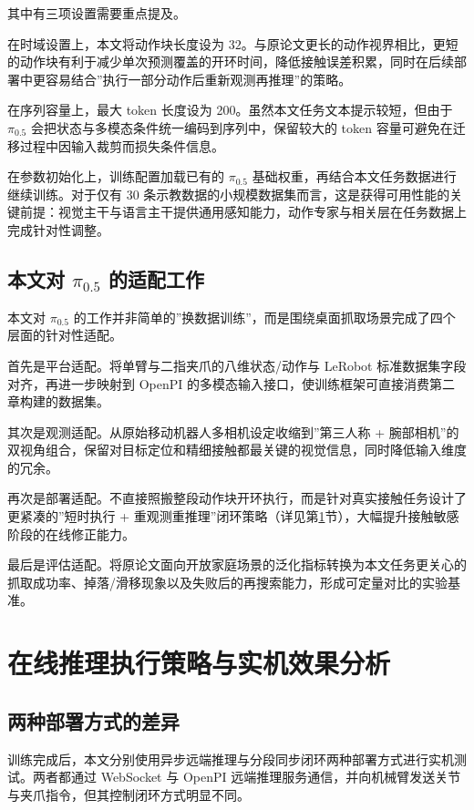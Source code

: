其中有三项设置需要重点提及。

在时域设置上，本文将动作块长度设为 $32$。与原论文更长的动作视界相比，更短的动作块有利于减少单次预测覆盖的开环时间，降低接触误差积累，同时在后续部署中更容易结合”执行一部分动作后重新观测再推理”的策略。

在序列容量上，最大 token 长度设为 200。虽然本文任务文本提示较短，但由于 $\pi_{0.5}$ 会把状态与多模态条件统一编码到序列中，保留较大的 token 容量可避免在迁移过程中因输入裁剪而损失条件信息。

在参数初始化上，训练配置加载已有的 $\pi_{0.5}$ 基础权重，再结合本文任务数据进行继续训练。对于仅有 30 条示教数据的小规模数据集而言，这是获得可用性能的关键前提：视觉主干与语言主干提供通用感知能力，动作专家与相关层在任务数据上完成针对性调整。

\subsection{本文对 $\pi_{0.5}$ 的适配工作}

本文对 $\pi_{0.5}$ 的工作并非简单的”换数据训练”，而是围绕桌面抓取场景完成了四个层面的针对性适配。

首先是平台适配。将单臂与二指夹爪的八维状态/动作与 LeRobot 标准数据集字段对齐，再进一步映射到 OpenPI 的多模态输入接口，使训练框架可直接消费第二章构建的数据集。

其次是观测适配。从原始移动机器人多相机设定收缩到”第三人称 + 腕部相机”的双视角组合，保留对目标定位和精细接触都最关键的视觉信息，同时降低输入维度的冗余。

再次是部署适配。不直接照搬整段动作块开环执行，而是针对真实接触任务设计了更紧凑的”短时执行 + 重观测重推理”闭环策略（详见第\ref{sec:pi05-deploy}节），大幅提升接触敏感阶段的在线修正能力。

最后是评估适配。将原论文面向开放家庭场景的泛化指标转换为本文任务更关心的抓取成功率、掉落/滑移现象以及失败后的再搜索能力，形成可定量对比的实验基准。

\section{在线推理执行策略与实机效果分析}
\label{sec:pi05-deploy}

\subsection{两种部署方式的差异}

训练完成后，本文分别使用异步远端推理与分段同步闭环两种部署方式进行实机测试。两者都通过 WebSocket 与 OpenPI 远端推理服务通信，并向机械臂发送关节与夹爪指令，但其控制闭环方式明显不同。


